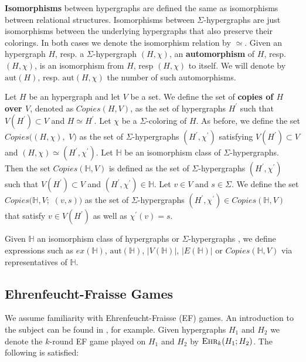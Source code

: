 \documentclass[12pt,notitlepage,a4paper]{article}
\theoremstyle{definition}
\newcommand{\ehr}{\textsc{Ehr}}
\newcommand{\aut}{\mathrm{aut}}
\begin{document}
\textbf{Isomorphisms} between hypergraphs are defined the same as 
isomorphisms between relational structures. Isomorphisms between $\Sigma$-hypergraphs are just
isomorphisms between the underlying hypergraphs that also preserve their colorings. 
In both cases we denote the isomorphism relation by $\simeq$. 
Given an hypergraph $H$, resp. a $\Sigma$-hypergraph $(H, \chi)$,
an \textbf{automorphism} of $H$, resp. $(H,\chi)$,
is an isomorphism from $H$, resp $(H,\chi)$ to itself.
We will denote by $\aut(H)$, resp. $\aut(H,\chi)$
 the number of such automorphisms. \par

Let $H$ be an hypergraph and let $V$ be a set. We define the
set of \textbf{copies of $H$ over $V$}, denoted as $Copies(H,V)$, 
as the set of hypergraphs 
$H^\prime$ such that
$V(H^\prime)\subset V$ and $H\simeq H^\prime$. Let 
$\chi$ be a $\Sigma$-coloring of $H$. 
As before, we define the set $Copies\big(
(H,\chi),\, \, V\big)$ as the set of $\Sigma$-hypergraphs
$(H^\prime,\chi^\prime)$ satisfying $V(H^\prime)\subset V$ and
$(H,\chi)\simeq (H^\prime,\chi^\prime)$. Let $\mathbb{H}$ be 
an isomorphism class of $\Sigma$-hypergraphs. Then the set
$Copies(\mathbb{H}, V)$ is defined as the set of $\Sigma$-hypergraphs
$(H^\prime,\chi^\prime)$ such that 
$V(H^\prime)\subset V$ and
$(H^\prime,\chi^\prime)\in \mathbb{H}$. 
Let $v\in V$ and $s\in \Sigma$. We define the
set $Copies\big(\mathbb{H}, V;\,\, (v,s)\big)$ 
as the set of $\Sigma$-hypergraphs
$(H^\prime,\chi^\prime)\in Copies(\mathbb{H}, V)$
that satisfy $v\in V(H^\prime)$ as well as
$\chi^\prime(v)=s$. \par

Given $\mathbb{H}$ an isomorphism class of hypergraphs or $\Sigma$-hypergraphs
, we define expressions
such as $ex(\mathbb{H})$, $\aut(\mathbb{H})$,
$|V(\mathbb{H})|$, $|E(\mathbb{H})|$ or
$Copies(\mathbb{H},V)$ via representatives of $\mathbb{H}$.\par 




\subsection{Ehrenfeucht-Fraisse Games}

We assume familiarity with Ehrenfeucht-Fraisse (EF) games.
An introduction to the subject can be found in
\cite[Section 2]{finitemodeltheory1}, for example. Given
hypergraphs $H_1$ and $H_2$ we denote the $k$-round EF game played 
on $H_1$ and
$H_2$ by $\ehr_k(H_1;H_2)$.
The following is satisfied:
\end{document}
